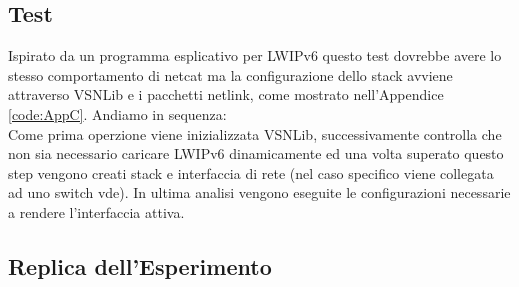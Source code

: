 \subsection{Test}
Ispirato da un programma esplicativo per LWIPv6 questo test dovrebbe avere lo stesso comportamento di netcat ma la configurazione dello stack avviene attraverso VSNLib e i pacchetti netlink, come mostrato nell'Appendice \ref{code:AppC}.
Andiamo in sequenza:\\
Come prima operzione viene inizializzata VSNLib, successivamente controlla che non sia necessario caricare LWIPv6 dinamicamente ed una volta superato questo step vengono creati stack e interfaccia di rete (nel caso specifico viene collegata ad uno switch vde). In ultima analisi vengono eseguite le configurazioni necessarie a rendere l'interfaccia attiva.
\subsection{Replica dell'Esperimento}
